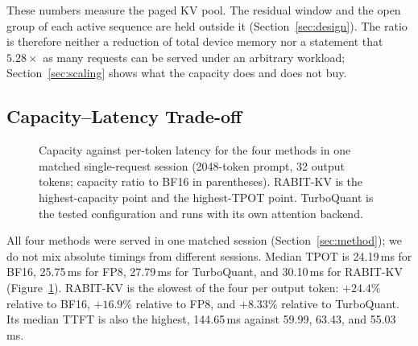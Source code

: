 \documentclass{article}
\begin{document}
These numbers measure the paged KV pool. The residual window and the open group of each active
sequence are held outside it (Section~\ref{sec:design}). The ratio is therefore neither a reduction of
total device memory nor a statement that $5.28\times$ as many requests can be served under an arbitrary
workload; Section~\ref{sec:scaling} shows what the capacity does and does not buy.

\subsection{Capacity--Latency Trade-off}
\label{sec:tradeoff}

\begin{figure}[t]
\centering
\caption{Capacity against per-token latency for the four methods in one matched single-request session
(2048-token prompt, 32 output tokens; capacity ratio to BF16 in parentheses). RABIT-KV is the
highest-capacity point and the highest-TPOT point. TurboQuant is the tested configuration and runs
with its own attention backend.}
\label{fig:tradeoff}
\end{figure}

All four methods were served in one matched session (Section~\ref{sec:method}); we do not mix absolute
timings from different sessions. Median TPOT is 24.19\,ms for BF16, 25.75\,ms for FP8, 27.79\,ms for
TurboQuant, and 30.10\,ms for RABIT-KV (Figure~\ref{fig:tradeoff}). RABIT-KV is the slowest of the four
per output token: $+24.4\%$ relative to BF16, $+16.9\%$ relative to FP8, and $+8.33\%$ relative to
TurboQuant. Its median TTFT is also the highest, 144.65\,ms against 59.99, 63.43, and 55.03\,ms.
\end{document}

